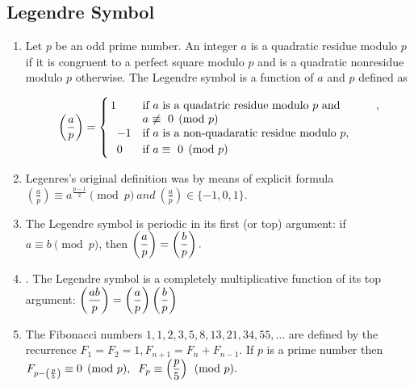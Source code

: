 \subsection{Legendre Symbol}
\begin{enumerate}
\item Let $\displaystyle p$ be an odd prime number. An integer $\displaystyle a$ is a quadratic residue modulo $\displaystyle p$ if it is congruent to a perfect square modulo $\displaystyle p$ and is a quadratic nonresidue modulo $\displaystyle p$ otherwise. The Legendre symbol is a function of $\displaystyle a$ and $\displaystyle p$ defined as
     
     $$\displaystyle \displaystyle \left( \frac{a}{p} \right)=
        {\begin{cases}
        \,1&{\parbox[t]{.6\textwidth}{if\ $a$\ is a quadatric residue modulo $p$\ and\\ \ $a$\ $\not\equiv\ 0 {\pmod{p}}$}},\\
        \;\;\,-1&{\text{if }}a\ {\text{is a non-quadaratic residue modulo }}p,\\
        \;\;\,0&{\text{if }}a \equiv\ 0 {\pmod{p}}
        \end{cases}}$$
    
\item Legenres's original definition was by means of explicit formula  
     $\displaystyle \left(\frac{a}{p}\right)\equiv a^{\frac{p-1}{2}} \pmod{p} \ and \ \left(\frac{a}{p}\right)\in\{-1,0,1\}.$
    
\item The Legendre symbol is periodic in its first (or top) argument: if\ $\displaystyle a \equiv b \pmod{p}$, then  
     $\displaystyle \displaystyle \left(\frac{a}{p}\right)=\left(\frac{b}{p}\right).$
    
\item. The Legendre symbol is a completely multiplicative function of its top argument:  
     $\displaystyle \displaystyle \left(\frac{ab}{p} \right) = \left(\frac{a}{p} \right) \left(\frac{b}{p} \right)$

\item The Fibonacci numbers $\displaystyle 1,1,2,3,5,8,13,21,34,55, \ldots $ are defined by the recurrence $\displaystyle F_1 = F_2 = 1,F_{n+1} = F_n + F_{n-1}.$ If $\displaystyle p$ is a prime number then    
     $\displaystyle \displaystyle F_{p-\left(\frac{p}{5}\right)} \equiv 0 {\pmod{p}}, \;\;F_p \equiv \left(\frac{p}{5}\right) {\pmod{p}}.$


\end{enumerate}
